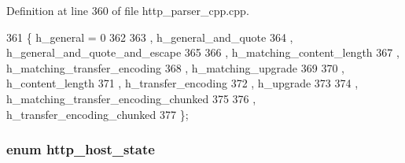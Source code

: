 Definition at line 360 of file http\+\_\+parser\+\_\+cpp.\+cpp.


\begin{DoxyCode}
361   \{ h_general = 0
362 
363   , h_general_and_quote
364   , h_general_and_quote_and_escape
365 
366   , h_matching_content_length
367   , h_matching_transfer_encoding
368   , h_matching_upgrade
369 
370   , h_content_length
371   , h_transfer_encoding
372   , h_upgrade
373 
374   , h_matching_transfer_encoding_chunked
375 
376   , h_transfer_encoding_chunked
377   \};
\end{DoxyCode}
\subsubsection[{http\+\_\+host\+\_\+state}]{\setlength{\rightskip}{0pt plus 5cm}enum {\bf http\+\_\+host\+\_\+state}}\label{http__parser__cpp_8cpp_ae8df1d915c4ab1e80985eb2611ccbdc9}
